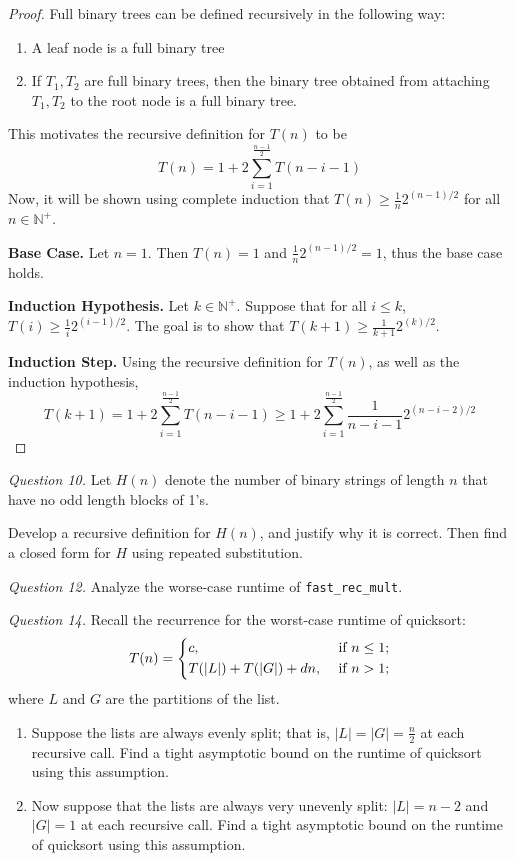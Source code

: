 \documentclass[11pt]{article}
\begin{document}
    \begin{proof}
        Full binary trees can be defined recursively in the following way:
        \begin{enumerate}
            \item A leaf node is a full binary tree
            \item If \(T_1,T_2\) are full binary trees, then the binary tree obtained from attaching \(T_1,T_2\) to the root node is a full binary tree.
        \end{enumerate}
        This motivates the recursive definition for \(T(n)\) to be
        \[
            T(n) = 1 + 2\sum_{i=1}^{\frac{n-1}{2}} T(n-i-1)
        \]
        Now, it will be shown using complete induction that \(T(n)\geq \frac{1}{n}2^{(n-1) / 2}\) for all \(n \in \mathbb{N}^+\).

        \textbf{Base Case.} Let \(n=1\). Then \(T(n) = 1\) and \(\frac{1}{n}2^{(n-1) / 2} = 1\), thus the base case holds.

        \textbf{Induction Hypothesis.} Let \(k \in \mathbb{N}^+\). Suppose that for all \(i \leq k\), \(T(i) \geq \frac{1}{i}2^{(i-1) / 2}\). The goal is to show that \(T(k+1) \geq \frac{1}{k+1}2^{(k) / 2}\).

        \textbf{Induction Step.} Using the recursive definition for \(T(n)\), as well as the induction hypothesis,
        \[
            T(k+1) = 1 + 2\sum_{i=1}^{\frac{n-1}{2}} T(n-i-1) \geq 1 + 2\sum_{i=1}^{\frac{n-1}{2}} \frac{1}{n-i-1}2^{(n-i-2) / 2}
        \]
    \end{proof}

    \textit{Question 10.} Let \(H(n)\) denote the number of binary strings of length \(n\) that have no odd length blocks of 1's.

    Develop a recursive definition for \(H(n)\), and justify why it is correct. Then find a closed form for \(H\) using repeated substitution.



    \textit{Question 12.} Analyze the worse-case runtime of \verb|fast_rec_mult|.

    \textit{Question 14.} Recall the recurrence for the worst-case runtime of quicksort:
    \[
        T(n)=\begin{dcases}
            c, &\text{ if } n\leq 1;\\
            T(|L|)+T(|G|) + dn, &\text{ if } n>1;\\
        \end{dcases}
    \]
    where \(L\) and \(G\) are the partitions of the list.
    \begin{enumerate}
        \item Suppose the lists are always evenly split; that is, \(|L| = |G| = \frac{n}{2}\) at each recursive call. Find a tight asymptotic bound on the runtime of quicksort using this assumption.
        \item Now suppose that the lists are always very unevenly split: \(|L| = n-2\) and \(|G| = 1\) at each recursive call. Find a tight asymptotic bound on the runtime of quicksort using this assumption.
    \end{enumerate}
\end{document}
